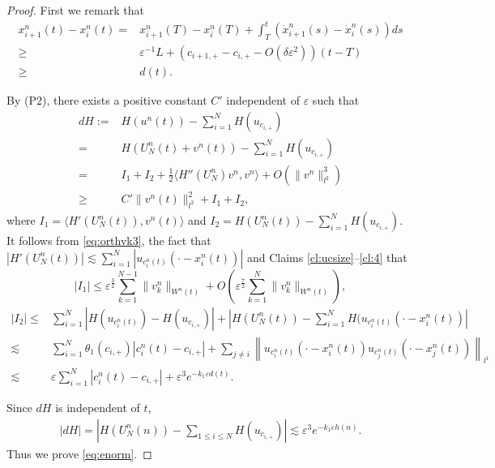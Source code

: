 \documentclass[11pt]{amsart}
\theoremstyle{remark}
\numberwithin{equation}{section}
\begin{document}
\begin{proof}
  First we remark that
\begin{align*}
 x_{i+1}^n(t)-x_i^n(t)=& x_{i+1}^n(T)-x_i^n(T)
+\int_T^t(\dot{x}_{i+1}^n(s)-\dot{x}_i^n(s))ds
\\ \ge & {\varepsilon}^{-1}L+\left(c_{i+1,+}-c_{i,+}-O(\delta{\varepsilon}^2)\right)(t-T)
\\ \ge & d(t).
\end{align*}
\par

By (P2), there exists a positive constant $C'$
independent of ${\varepsilon}$ such that
  \begin{align*}
dH:=& H(u^n(t))-\sum_{i=1}^NH(u_{c_{i,+}})
\\ = & H(U_N^n(t)+v^n(t))-\sum_{i=1}^NH(u_{c_{i,+}})
\\ = & I_1+I_2+\frac12{\langle} H''(U_N^n)v^n,v^n{\rangle}+O(\|v^n\|_{l^2}^3)
\\ \ge & C'\|v^n(t)\|_{l^2}^2+I_1+I_2,
  \end{align*}
where
$I_1={\langle} H'(U_N^n(t)),v^n(t){\rangle}$ and $I_2=H(U_N^n(t))-\sum_{i=1}^NH(u_{c_{i,+}}).$
It follows from \eqref{eq:orthvk3}, the fact that
$|H'(U_N^n(t))|\lesssim \sum_{i=1}^N |u_{c_i^n(t)}(\cdot-x_i^n(t))|$ and
Claims \ref{cl:ucsize}--\ref{cl:4} that 
$$|I_1| \le  {\varepsilon}^{\frac32}\sum_{k=1}^{N-1}\|v_k^n\|_{W^n(t)}
+O\left({\varepsilon}^{\frac72}\sum_{k=1}^N\|v_k^n\|_{W^n(t)}\right),$$
\begin{align*}
  |I_2|\le &
\sum_{i=1}^N|H(u_{c_i^n(t)})-H(u_{c_{i,+}})|
+\left|H(U_N^n(t))-\sum_{i=1}^NH(u_{c_i^n(t)}(\cdot-x_i^n(t))\right|
\\ \lesssim &
\sum_{i=1}^N\theta_1(c_{i,+})|c_i^n(t)-c_{i,+}|
+\sum_{j\ne i}
\left\|u_{c_i^n(t)}(\cdot-x_i^n(t))u_{c_j^n(t)}(\cdot-x_j^n(t))\right\|_{l^1}
\\ \lesssim & 
{\varepsilon}\sum_{i=1}^N|c_i^n(t)-c_{i,+}|+{\varepsilon}^3e^{-k_1{\varepsilon} d(t)}.
\end{align*}

Since $dH$ is independent of $t$,
\begin{align*}
|dH|=\left| H(U_N^n(n))-\sum_{1\le i\le N}H(u_{c_{i,+}})\right|
\lesssim  {\varepsilon}^3e^{-k_1{\varepsilon} h(n)}.
\end{align*}
Thus we prove \eqref{eq:enorm}.
\par


\end{proof}
\end{document}
